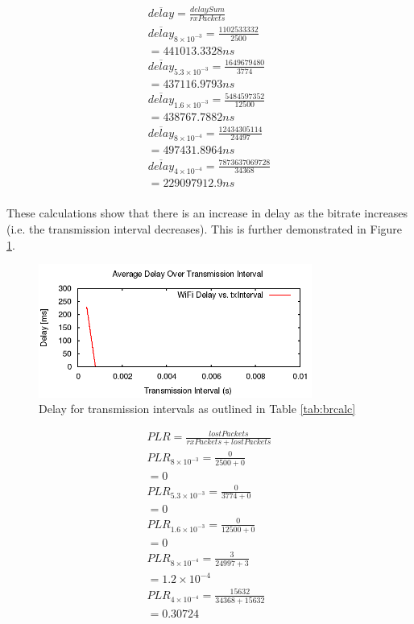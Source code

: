 \begin{gather*}
	\overline{delay}=\frac{delaySum}{rxPackets} \\
\overline{delay}_{8\times10^{-3}}=\frac{1102533332}{2500} \\
	= 441013.3328ns \\
	\overline{delay}_{5.3\times10^{-3}}=\frac{1649679480}{3774} \\
	= 437116.9793ns \\
	\overline{delay}_{1.6\times10^{-3}}=\frac{5484597352}{12500} \\
	= 438767.7882ns \\
	\overline{delay}_{8\times10^{-4}}=\frac{12434305114}{24497} \\
	= 497431.8964ns \\
	\overline{delay}_{4\times10^{-4}}=\frac{7873637069728}{34368} \\
	= 229097912.9ns \\
\end{gather*}

\par These calculations show that there is an increase in delay as the bitrate
increases (i.e. the transmission interval decreases). This is further
demonstrated in Figure \ref{fig:QAP2Delay}.

\begin{figure}[H]
	\centering
	\includegraphics[width=0.8\textwidth]{images/EE500/QA/P2/Images/wifi-delay}
	\caption{Delay for transmission intervals as outlined in Table
	\ref{tab:brcalc}}
	\label{fig:QAP2Delay}
\end{figure}

\begin{gather*}
	PLR=\frac{lostPackets}{rxPackets+lostPackets} \\
	PLR_{8\times10^{-3}}=\frac{0}{2500+0} \\
	= 0 \\
	PLR_{5.3\times10^{-3}}=\frac{0}{3774+0} \\
	= 0 \\
	PLR_{1.6\times10^{-3}}=\frac{0}{12500+0} \\
	= 0 \\
	PLR_{8\times10^{-4}}=\frac{3}{24997+3} \\
	= 1.2\times10^{-4} \\
	PLR_{4\times10^{-4}}=\frac{15632}{34368+15632} \\
	= 0.30724
\end{gather*}

